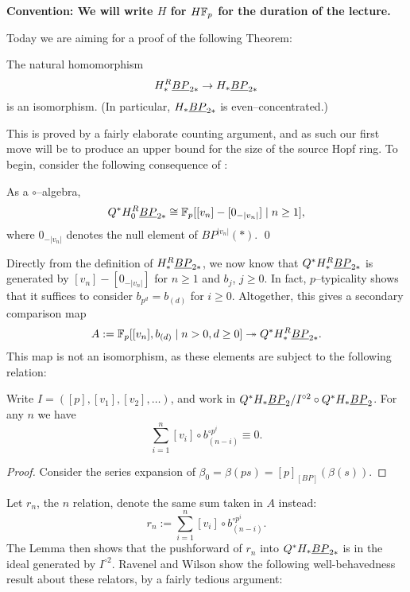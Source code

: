 \begin{center}
\textbf{Convention: We will write $H$ for $H\mathbb F_p$ for the duration of the lecture.}
\end{center}

Today we are aiming for a proof of the following Theorem:

\begin{theorem}\label{HFpBPCooperationsTheorem}
The natural homomorphism \[H_*^R \underline{\smash{BP}}_{2*} \to H_* \underline{\smash{BP}}_{2*}\] is an isomorphism.  (In particular, $H_* \underline{\smash{BP}}_{2*}$ is even--concentrated.)
\end{theorem}

\noindent This is proved by a fairly elaborate counting argument, and as such our first move will be to produce an upper bound for the size of the source Hopf ring.  To begin, consider the following consequence of :

\begin{corollary}
As a $\circ$--algebra, \[Q^* H_0^R \underline{\smash{BP}}_{2*} \cong \mathbb F_p[[v_n] - [0_{-|v_n|}] \mid n \ge 1],\] where $0_{-|v_n|}$ denotes the null element of $BP^{|v_n|}(*)$. \qed
\end{corollary}

Directly from the definition of $H_*^R \underline{\smash{BP}}_{2*}$, we now know that $Q^* H_*^R \underline{\smash{BP}}_{2*}$ is generated by $[v_n] - [0_{-|v_n|}]$ for $n \ge 1$ and $b_j$, $j \ge 0$.  In fact, $p$--typicality shows~\cite[Lemma 4.14]{RavenelWilsonHopfRingForMU} that it suffices to consider $b_{p^d} = b_{(d)}$ for $i \ge 0$.  Altogether, this gives a secondary comparison map \[A := \mathbb F_p[[v_n], b_{(d)} \mid n > 0, d \ge 0] \twoheadrightarrow Q^* H_*^R \underline{\smash{BP}}_{2*}.\]  This map is not an isomorphism, as these elements are subject to the following relation:

\begin{lemma}
Write $I = ([p], [v_1], [v_2], \ldots)$, and work in $Q^* H_* \underline{\smash{BP}}_{2} / I^{\circ 2} \circ Q^* H_* \underline{\smash{BP}}_{2}$.  For any $n$ we have \[\sum_{i=1}^n [v_i] \circ b_{(n-i)}^{\circ p^i} \equiv 0.\]
\end{lemma}
\begin{proof}
Consider the series expansion of $\beta_0 = \beta(ps) = [p]_{[BP]}(\beta(s))$.
\end{proof}

Let $r_n$, the $n${\th} relation, denote the same sum taken in $A$ instead: \[r_n := \sum_{i=1}^n [v_i] \circ b_{(n-i)}^{\circ p^i}.\]  The Lemma then shows that the pushforward of $r_n$ into $Q^* H_* \underline{\smash{BP}}_{2*}$ is in the ideal generated by $I^{\circ 2}$.  Ravenel and Wilson show the following well-behavedness result about these relators, by a fairly tedious argument:

